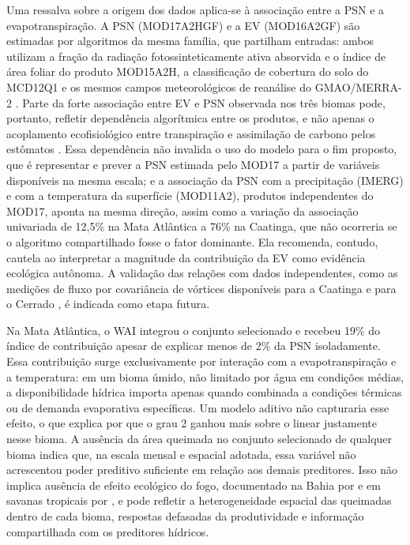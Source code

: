 \documentclass[a4paper,fleqn]{cas-dc}
\begin{document}
Uma ressalva sobre a origem dos dados aplica-se à associação entre a PSN e a evapotranspiração. A PSN (MOD17A2HGF) e a EV (MOD16A2GF) são estimadas por algoritmos da mesma família, que partilham entradas: ambos utilizam a fração da radiação fotossinteticamente ativa absorvida e o índice de área foliar do produto MOD15A2H, a classificação de cobertura do solo do MCD12Q1 e os mesmos campos meteorológicos de reanálise do GMAO/MERRA-2 \citep{running2004,running2021gpp,running2021et}. Parte da forte associação entre EV e PSN observada nos três biomas pode, portanto, refletir dependência algorítmica entre os produtos, e não apenas o acoplamento ecofisiológico entre transpiração e assimilação de carbono pelos estômatos \citep{lawson2019}. Essa dependência não invalida o uso do modelo para o fim proposto, que é representar e prever a PSN estimada pelo MOD17 a partir de variáveis disponíveis na mesma escala; e a associação da PSN com a precipitação (IMERG) e com a temperatura da superfície (MOD11A2), produtos independentes do MOD17, aponta na mesma direção, assim como a variação da associação univariada de 12,5\% na Mata Atlântica a 76\% na Caatinga, que não ocorreria se o algoritmo compartilhado fosse o fator dominante. Ela recomenda, contudo, cautela ao interpretar a magnitude da contribuição da EV como evidência ecológica autônoma. A validação das relações com dados independentes, como as medições de fluxo por covariância de vórtices disponíveis para a Caatinga \citep{mendes2020,mendes2025} e para o Cerrado \citep{vourlitis2022}, é indicada como etapa futura.

Na Mata Atlântica, o WAI integrou o conjunto selecionado e recebeu 19\% do índice de contribuição apesar de explicar menos de 2\% da PSN isoladamente. Essa contribuição surge exclusivamente por interação com a evapotranspiração e a temperatura: em um bioma úmido, não limitado por água em condições médias, a disponibilidade hídrica importa apenas quando combinada a condições térmicas ou de demanda evaporativa específicas. Um modelo aditivo não capturaria esse efeito, o que explica por que o grau 2 ganhou mais sobre o linear justamente nesse bioma. A ausência da área queimada no conjunto selecionado de qualquer bioma indica que, na escala mensal e espacial adotada, essa variável não acrescentou poder preditivo suficiente em relação aos demais preditores. Isso não implica ausência de efeito ecológico do fogo, documentado na Bahia por \citet{benfica2022,benfica2023} e em savanas tropicais por \citet{navarro2025}, e pode refletir a heterogeneidade espacial das queimadas dentro de cada bioma, respostas defasadas da produtividade e informação compartilhada com os preditores hídricos.
\end{document}
